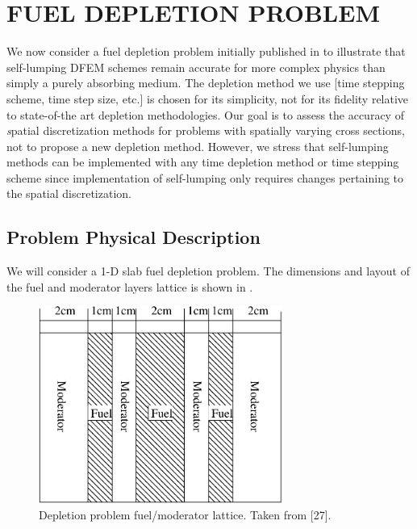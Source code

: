 %
%
%



\chapter{\uppercase{Fuel Depletion Problem}}
\label{sec:chapter5_depletion}

We now consider a fuel depletion problem initially published in \cite{part_2_paper} to illustrate that self-lumping DFEM schemes remain accurate for more complex physics than simply a purely absorbing medium.
The depletion method we use [time stepping scheme, time step size, etc.] is chosen for its simplicity, not for its fidelity relative to state-of-the art depletion methodologies.  
Our goal is to assess the accuracy of {\emph spatial discretization} methods for problems with spatially varying cross sections, not to propose a new depletion method.  
However, we stress that self-lumping methods can be implemented with any time depletion method or time stepping scheme since implementation of self-lumping  only requires changes pertaining to the spatial discretization. 

\section{Problem Physical Description}

We will consider a 1-D slab fuel depletion problem.
The dimensions and layout of the fuel and moderator layers lattice is shown in .  
\begin{figure}[!htp]
\begin{center}
\includegraphics[width=8cm]{chapter5_depletion/article_grid.pdf}
\end{center}
\caption{Depletion problem fuel/moderator lattice.  Taken from [27].}
\label{fig:lattice}
\end{figure}

